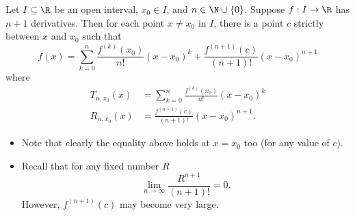 \begin{theorem}\label{Taylor's Theorem with Lagrange Remainder}
    Let \( I \subseteq  \R   \) be an open interval, \( {x}_{0} \in I  \), and \( n \in \N \cup \{ 0  \}  \). Suppose \( f: I \to \R  \) has \( n + 1  \) derivatives. Then for each point \( x \neq {x}_{0} \) in \( I  \), there is a point \( c  \) strictly between \( x  \) and \( {x}_{0} \) such that 
    \[  f(x) = \sum_{ k=0  }^{  n } \frac{ f^{(k)}({x}_{0})  }{ n!  } (x - {x}_{0})^{k} + \frac{ f^{(n+1)}(c) }{  (n+1)! } (x - {x}_{0})^{n+1} \]
    where 
    \begin{align*}
        {T}_{n,{x}_{0}}(x) &= \sum_{ k=0  }^{ n } \frac{ f^{(k)}({x}_{0}) }{ n!  }  ( x - {x}_{0})^{k} \\
        {R}_{n,{x}_{0}}(x) &= \frac{ f^{(n+1)}(c) }{  (n+1)! }  (x - {x}_{0})^{n+1}.
    \end{align*}
\end{theorem}

\begin{remark}
    \begin{itemize}
        \item Note that clearly the equality above holds at \( x = {x}_{0} \) too (for any value of \( c  \)).
        \item Recall that for any fixed number \( R  \)
            \[ \lim_{ n \to \infty  }  \frac{ R^{n+1} }{ (n+1)! }  = 0.   \]
            However, \( f^{(n+1)}(c) \) may become very large.
    \end{itemize}
\end{remark}


